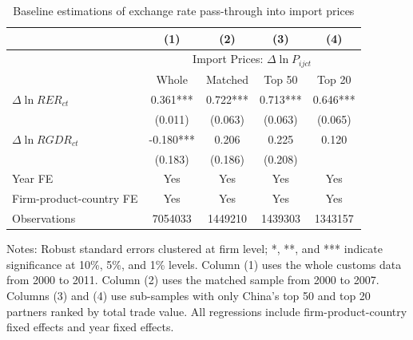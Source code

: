 \documentclass[12pt]{article}
\begin{document}
\begin{table}[htbp]
	\centering
	\caption{Baseline estimations of exchange rate pass-through into import prices}
	\begin{threeparttable}
		\begin{tabular}{lcccc}
			\toprule
			& (1)   & (2)   & (3)   & (4) \\
			\midrule
			& \multicolumn{4}{c}{Import Prices: $\Delta \ln P_{ijct}$} \\
			& Whole & Matched & Top 50 & Top 20 \\
			\midrule
			$\Delta \ln RER_{ct}$ & 0.361*** & 0.722*** & 0.713*** & 0.646*** \\
			& (0.011) & (0.063) & (0.063) & (0.065) \\
			$\Delta \ln RGDR_{ct}$ & -0.180*** & 0.206 & 0.225 & 0.120 \\
			& (0.183) & (0.186) & (0.208) \\
			Year FE  & Yes   & Yes   & Yes   & Yes \\
			Firm-product-country FE & Yes   & Yes   & Yes   & Yes \\
			Observations & 7054033 & 1449210 & 1439303 & 1343157 \\
			\bottomrule
		\end{tabular}
		\begin{tablenotes}
			\footnotesize
			\item[Notes:] Robust standard errors clustered at firm level;  *, **, and *** indicate significance at 10\%, 5\%, and 1\% levels. Column (1) uses the whole customs data from 2000 to 2011. Column (2) uses the matched sample from 2000 to 2007. Columns (3) and (4) use sub-samples with only China's top 50 and top 20 partners ranked by total trade value. All regressions include firm-product-country fixed effects and year fixed effects. 
		\end{tablenotes}
	\end{threeparttable}
	\label{tab.baseline}
\end{table}
\end{document}
